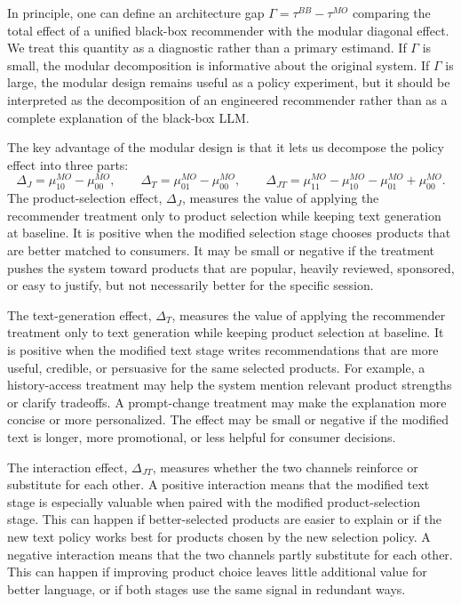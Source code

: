 \documentclass[11pt]{article}
\begin{document}
In principle, one can define an architecture gap $\Gamma = \tau^{BB} - \tau^{MO}$ comparing the total effect of a unified black-box recommender with the modular diagonal effect. We treat this quantity as a diagnostic rather than a primary estimand. If $\Gamma$ is small, the modular decomposition is informative about the original system. If $\Gamma$ is large, the modular design remains useful as a policy experiment, but it should be interpreted as the decomposition of an engineered recommender rather than as a complete explanation of the black-box LLM.

The key advantage of the modular design is that it lets us decompose the policy effect into three parts:
\begin{equation}
\Delta_J = \mu_{10}^{MO} - \mu_{00}^{MO}, \qquad \Delta_T = \mu_{01}^{MO} - \mu_{00}^{MO}, \qquad \Delta_{JT} = \mu_{11}^{MO} - \mu_{10}^{MO} - \mu_{01}^{MO} + \mu_{00}^{MO}.
\label{eq:component-effects}
\end{equation}
The product-selection effect, $\Delta_J$, measures the value of applying the recommender treatment only to product selection while keeping text generation at baseline. It is positive when the modified selection stage chooses products that are better matched to consumers. It may be small or negative if the treatment pushes the system toward products that are popular, heavily reviewed, sponsored, or easy to justify, but not necessarily better for the specific session.

The text-generation effect, $\Delta_T$, measures the value of applying the recommender treatment only to text generation while keeping product selection at baseline. It is positive when the modified text stage writes recommendations that are more useful, credible, or persuasive for the same selected products. For example, a history-access treatment may help the system mention relevant product strengths or clarify tradeoffs. A prompt-change treatment may make the explanation more concise or more personalized. The effect may be small or negative if the modified text is longer, more promotional, or less helpful for consumer decisions.

The interaction effect, $\Delta_{JT}$, measures whether the two channels reinforce or substitute for each other. A positive interaction means that the modified text stage is especially valuable when paired with the modified product-selection stage. This can happen if better-selected products are easier to explain or if the new text policy works best for products chosen by the new selection policy. A negative interaction means that the two channels partly substitute for each other. This can happen if improving product choice leaves little additional value for better language, or if both stages use the same signal in redundant ways.
\end{document}

